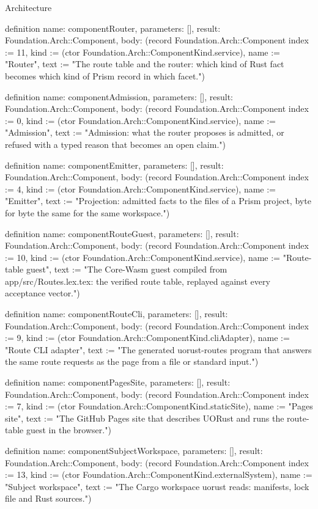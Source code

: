 \begin{lexlean}{Architecture}
\begin{semanticmodule}
definition{
  name: componentRouter,
  parameters: [],
  result: Foundation.Arch::Component,
  body: (record Foundation.Arch::Component {index := 11, kind := (ctor Foundation.Arch::ComponentKind.service), name := "Router", text := "The route table and the router: which kind of Rust fact becomes which kind of Prism record in which facet."})
}

definition{
  name: componentAdmission,
  parameters: [],
  result: Foundation.Arch::Component,
  body: (record Foundation.Arch::Component {index := 0, kind := (ctor Foundation.Arch::ComponentKind.service), name := "Admission", text := "Admission: what the router proposes is admitted, or refused with a typed reason that becomes an open claim."})
}

definition{
  name: componentEmitter,
  parameters: [],
  result: Foundation.Arch::Component,
  body: (record Foundation.Arch::Component {index := 4, kind := (ctor Foundation.Arch::ComponentKind.service), name := "Emitter", text := "Projection: admitted facts to the files of a Prism project, byte for byte the same for the same workspace."})
}

definition{
  name: componentRouteGuest,
  parameters: [],
  result: Foundation.Arch::Component,
  body: (record Foundation.Arch::Component {index := 10, kind := (ctor Foundation.Arch::ComponentKind.service), name := "Route-table guest", text := "The Core-Wasm guest compiled from app/src/Routes.lex.tex: the verified route table, replayed against every acceptance vector."})
}

definition{
  name: componentRouteCli,
  parameters: [],
  result: Foundation.Arch::Component,
  body: (record Foundation.Arch::Component {index := 9, kind := (ctor Foundation.Arch::ComponentKind.cliAdapter), name := "Route CLI adapter", text := "The generated uorust-routes program that answers the same route requests as the page from a file or standard input."})
}

definition{
  name: componentPagesSite,
  parameters: [],
  result: Foundation.Arch::Component,
  body: (record Foundation.Arch::Component {index := 7, kind := (ctor Foundation.Arch::ComponentKind.staticSite), name := "Pages site", text := "The GitHub Pages site that describes UORust and runs the route-table guest in the browser."})
}

definition{
  name: componentSubjectWorkspace,
  parameters: [],
  result: Foundation.Arch::Component,
  body: (record Foundation.Arch::Component {index := 13, kind := (ctor Foundation.Arch::ComponentKind.externalSystem), name := "Subject workspace", text := "The Cargo workspace uorust reads: manifests, lock file and Rust sources."})
}


\end{semanticmodule}
\end{lexlean}
